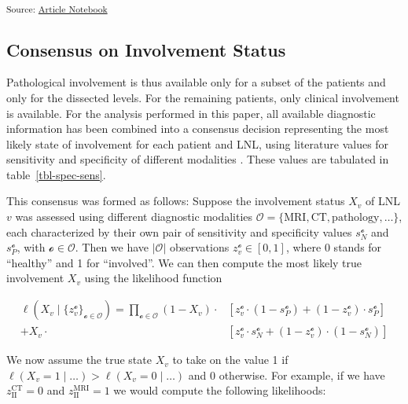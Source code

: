 \documentclass[
  sn-mathphys-num,
]{sn-jnl}
\begin{document}
\textsubscript{Source:
\href{https://rmnldwg.github.io/bilateral-paper/manuscript-preview.html}{Article
Notebook}}

\subsection{Consensus on Involvement Status}\label{sec-data-consensus}

Pathological involvement is thus available only for a subset of the
patients and only for the dissected levels. For the remaining patients,
only clinical involvement is available. For the analysis performed in
this paper, all available diagnostic information has been combined into
a consensus decision representing the most likely state of involvement
for each patient and LNL, using literature values for sensitivity and
specificity of different modalities
\citep{de_bondt_detection_2007, kyzas_18f-fluorodeoxyglucose_2008}.
These values are tabulated in table~\ref{tbl-spec-sens}.

This consensus was formed as follows: Suppose the involvement status
\(X_v\) of LNL \(v\) was assessed using different diagnostic modalities
\(\mathcal{O} = \{ \text{MRI}, \text{CT}, \text{pathology}, \ldots \}\),
each characterized by their own pair of sensitivity and specificity
values \(s_N^{\mathcal{o}}\) and \(s_P^{\mathcal{o}}\), with
\(\mathcal{o} \in \mathcal{O}\). Then we have \(|\mathcal{O}|\)
observations \(z_v^{\mathcal{o}} \in \left[ 0, 1 \right]\), where 0
stands for ``healthy'' and 1 for ``involved''. We can then compute the
most likely true involvement \(X_v\) using the likelihood function

\[
\begin{aligned}
\ell \left( X_v \mid \{ z_v^{\mathcal{o}} \}_{\mathcal{o} \in \mathcal{O}} \right) = \prod_{\mathcal{o} \in \mathcal{O}}
\left( 1 - X_v \right) \cdot &\left[ z_v^{\mathcal{o}} \cdot \left( 1 - s_P^{\mathcal{o}} \right) + \left( 1 - z_v^{\mathcal{o}} \right) \cdot s_P^{\mathcal{o}} \right] \\
+ X_v \cdot &\left[ z_v^{\mathcal{o}} \cdot s_N^{\mathcal{o}} + \left( 1 - z_v^{\mathcal{o}} \right) \cdot (1 - s_N^{\mathcal{o}}) \right]
\end{aligned}
\]

We now assume the true state \(X_v\) to take on the value 1 if
\(\ell \left( X_v = 1 \mid \ldots \right) > \ell \left( X_v = 0 \mid \ldots \right)\)
and 0 otherwise. For example, if we have \(z_\text{II}^\text{CT} = 0\)
and \(z_\text{II}^\text{MRI} = 1\) we would compute the following
likelihoods:
\end{document}
